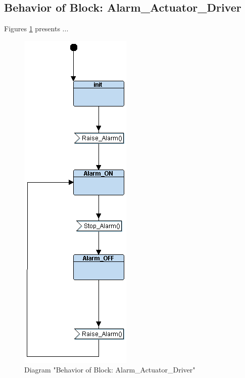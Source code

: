 \subsection{Behavior of Block: Alarm\_Actuator\_Driver}
Figures \ref{fig:AlarmActuatorDriverAlarmActuatorDriver24} presents ...
\begin{figure}[htb]
\centering
\includegraphics[width=\textwidth]{img_2_4.png}
\caption{Diagram "Behavior of Block: Alarm\_Actuator\_Driver"}
\label{fig:AlarmActuatorDriverAlarmActuatorDriver24}
\end{figure}

